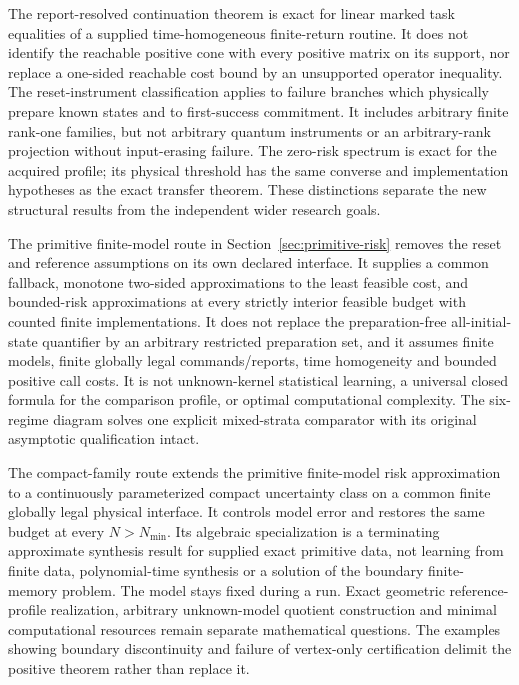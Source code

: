 

The report-resolved continuation theorem is exact for linear marked task equalities of a supplied time-homogeneous finite-return routine. It does not identify the reachable positive cone with every positive matrix on its support, nor replace a one-sided reachable cost bound by an unsupported operator inequality. The reset-instrument classification applies to failure branches which physically prepare known states and to first-success commitment. It includes arbitrary finite rank-one families, but not arbitrary quantum instruments or an arbitrary-rank projection without input-erasing failure. The zero-risk spectrum is exact for the acquired profile; its physical threshold has the same converse and implementation hypotheses as the exact transfer theorem. These distinctions separate the new structural results from the independent wider research goals.


The primitive finite-model route in Section~\ref{sec:primitive-risk} removes the reset and reference assumptions on its own declared interface. It supplies a common fallback, monotone two-sided approximations to the least feasible cost, and bounded-risk approximations at every strictly interior feasible budget with counted finite implementations. It does not replace the preparation-free all-initial-state quantifier by an arbitrary restricted preparation set, and it assumes finite models, finite globally legal commands/reports, time homogeneity and bounded positive call costs. It is not unknown-kernel statistical learning, a universal closed formula for the comparison profile, or optimal computational complexity. The six-regime diagram solves one explicit mixed-strata comparator with its original asymptotic qualification intact.


The compact-family route extends the primitive finite-model risk approximation to a continuously parameterized compact uncertainty class on a common finite globally legal physical interface. It controls model error and restores the same budget at every $N>N_{\min}$. Its algebraic specialization is a terminating approximate synthesis result for supplied exact primitive data, not learning from finite data, polynomial-time synthesis or a solution of the boundary finite-memory problem. The model stays fixed during a run. Exact geometric reference-profile realization, arbitrary unknown-model quotient construction and minimal computational resources remain separate mathematical questions. The examples showing boundary discontinuity and failure of vertex-only certification delimit the positive theorem rather than replace it.



